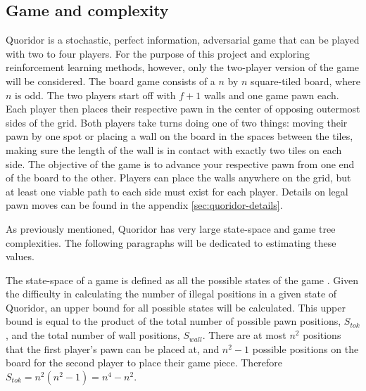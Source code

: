 \documentclass[journal, a4paper]{IEEEtran}
\begin{document}
\subsection{Game and complexity}
\label{ssec:complexity}

Quoridor is a stochastic, perfect information, adversarial game that can be played with two to four players. For the purpose of this project and exploring reinforcement learning methods, however, only the two-player version of the game will be considered. The board game consists of a $n$ by $n$ square-tiled board, where $n$ is odd. 
The two players start off with $f+1$ walls and one game pawn each. Each player then places their respective pawn in the center of opposing outermost sides of the grid. Both players take turns doing one of two things: moving their pawn by one spot or placing a wall on the board in the spaces between the tiles, making sure the length of the wall is in contact with exactly two tiles on each side. 
The objective of the game is to advance your respective pawn from one end of the board to the other. Players can place the walls anywhere on the grid, but at least one viable path to each side must exist for each player. Details on legal pawn moves can be found in the appendix \ref{sec:quoridor-details}.

As previously mentioned, Quoridor has very large state-space and game tree complexities. The following paragraphs will be dedicated to estimating these values. 

The state-space of a game is defined as all the possible states of the game \cite{heuristic-agent}. Given the difficulty in calculating the number of illegal positions in a given state of Quoridor, an upper bound for all possible states will be calculated. 
This upper bound is equal to the product of the total number of possible pawn positions, $S_{tok}$, and the total number of wall positions, $S_{wall}$.  There are at most $n^{2}$ positions that the first player's pawn can be placed at, and $n^{2} -1$ possible positions on the board for the second player to place their game piece. Therefore $S_{tok} = n^{2}(n^{2}-1) = n^{4} - n^{2}$.
\end{document}
